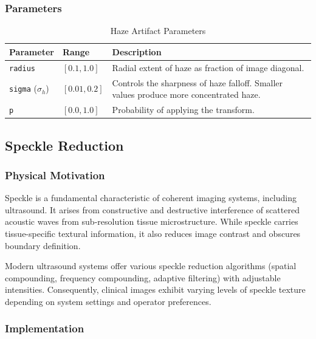 \documentclass{article}
\theoremstyle{plain}
\theoremstyle{definition}
\theoremstyle{remark}
\begin{document}
\subsubsection{Parameters}

\begin{table}[h]
\centering
\caption{Haze Artifact Parameters}
\label{tab:haze_artifact_params}
\begin{tabular}{@{}llp{7cm}@{}}
\toprule
\textbf{Parameter} & \textbf{Range} & \textbf{Description} \\
\midrule
\texttt{radius} & $[0.1, 1.0]$ & Radial extent of haze as fraction of image diagonal. \\
\texttt{sigma} ($\sigma_h$) & $[0.01, 0.2]$ & Controls the sharpness of haze falloff. Smaller values produce more concentrated haze. \\
\texttt{p} & $[0.0, 1.0]$ & Probability of applying the transform. \\
\bottomrule
\end{tabular}
\end{table}

\subsection{Speckle Reduction}
\label{appendix:speckle_reduction}

\subsubsection{Physical Motivation}

Speckle is a fundamental characteristic of coherent imaging systems, including ultrasound. It arises from constructive and destructive interference of scattered acoustic waves from sub-resolution tissue microstructure. While speckle carries tissue-specific textural information, it also reduces image contrast and obscures boundary definition.

Modern ultrasound systems offer various speckle reduction algorithms (spatial compounding, frequency compounding, adaptive filtering) with adjustable intensities. Consequently, clinical images exhibit varying levels of speckle texture depending on system settings and operator preferences.

\subsubsection{Implementation}
\end{document}

